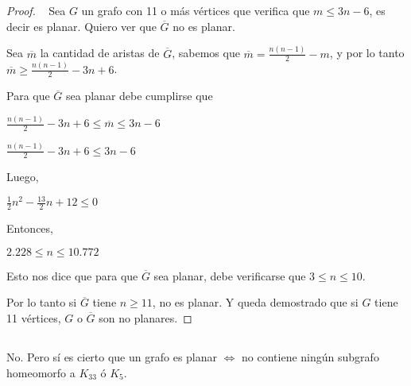 \begin{proof}

~
Sea $G$ un grafo con 11 o más vértices que verifica que $m \leq 3n - 6$, es decir es planar. Quiero ver que $\overline{G}$ no es planar.

Sea $\overline{m}$ la cantidad de aristas de $\overline{G}$, sabemos que $\overline{m} = \frac{n(n - 1)}{2} - m$, y por lo tanto $\overline{m} \geq \frac{n(n - 1)}{2} - 3n + 6$.

Para que $\overline{G}$ sea planar debe cumplirse que 

\begin{center}
    $\frac{n(n - 1)}{2} - 3n + 6 \leq \overline{m} \leq 3n - 6$

    $\frac{n(n - 1)}{2} - 3n + 6 \leq 3n - 6$
\end{center}

Luego,

\begin{center}
	$\frac{1}{2}n^2 - \frac{13}{2}n + 12 \leq 0$
\end{center}

Entonces,

\begin{center}
	$2.228 \leq n \leq 10.772$
\end{center}

Esto nos dice que para que $\overline{G}$ sea planar, debe verificarse que $3 \leq n \leq 10$.

Por lo tanto si $\overline{G}$ tiene $n \geq 11$, no es planar. Y queda demostrado que si $G$ tiene 11 vértices, $G$ o $\overline{G}$ son no planares.
\end{proof}
\subsection{}
No. Pero sí es cierto que un grafo es planar $\Longleftrightarrow$ no contiene ningún subgrafo homeomorfo a $K_{33}$ ó $K_5$.